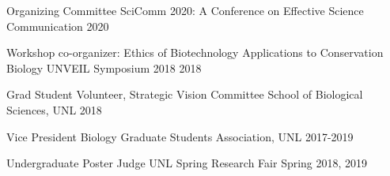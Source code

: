 \begin{cvservices}
 \cvservice
    {Organizing Committee}
    {SciComm 2020: A Conference on Effective Science Communication}
    {2020}
    
  \cvservice
    {Workshop co-organizer: Ethics of Biotechnology Applications to Conservation Biology}
    {UNVEIL Symposium 2018}
    {2018}

  \cvservice
    {Grad Student Volunteer, Strategic Vision Committee}
    {School of Biological Sciences, UNL}
    {2018}
    
  \cvservice
    {Vice President}
    {Biology Graduate Students Association, UNL}
    {2017-2019}
    
  \cvservice
    {Undergraduate Poster Judge}
    {UNL Spring Research Fair}
    {Spring 2018, 2019}
\end{cvservices}
